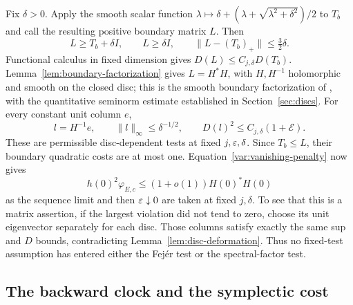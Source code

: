 Fix $\delta>0$.  Apply the smooth scalar function
$\lambda\mapsto\delta+(\lambda+\sqrt{\lambda^2+\delta^2})/2$
to $T_b$ and call the resulting positive boundary matrix $L$.
Then
\[
 L\ge T_b+\delta I,\qquad L\ge\delta I,
 \qquad \|L-(T_b)_+\|\le\tfrac32\delta.
\]
Functional calculus in fixed dimension gives
$D(L)\le C_{j,\delta}D(T_b)$.
Lemma~\ref{lem:boundary-factorization} gives
$L=H^*H$, with $H,H^{-1}$ holomorphic and smooth on the closed disc;
this is the smooth boundary factorization of
\cite[Theorem~2.1]{BerndtssonRosay}, with the quantitative seminorm
estimate established in Section~\ref{sec:discs}.
For every constant unit column $e$,
\[
 l=H^{-1}e,\qquad \|l\|_\infty\le\delta^{-1/2},
 \qquad D(l)^2\le C_{j,\delta}(1+\mathcal E).
\]
These are permissible disc-dependent tests at fixed $j,\varepsilon,\delta$.
Since $T_b\le L$, their boundary quadratic costs are at most one.
Equation~\eqref{var:vanishing-penalty} now gives
\begin{equation}
 h(0)^2\varphi_{E,c}\le(1+o(1))H(0)^*H(0)
 \label{var:center-majorant}
\end{equation}
as the sequence limit and then $\varepsilon\downarrow0$ are taken at fixed
$j,\delta$.  To see that this is a matrix assertion, if the largest
violation did not tend to zero, choose its unit eigenvector separately
for each disc.  Those columns satisfy exactly the same sup and $D$
bounds, contradicting Lemma~\ref{lem:disc-deformation}.
Thus no fixed-test assumption has entered either the Fej\'er test or
the spectral-factor test.

\subsection{The backward clock and the symplectic cost}

